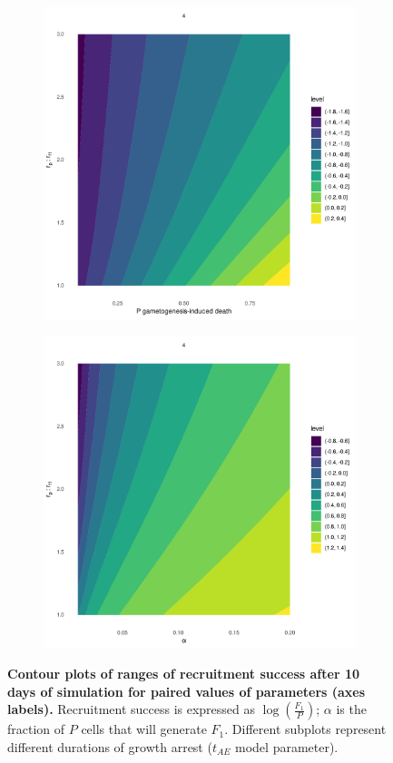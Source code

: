 \documentclass[a4paper,oneside]{article}
\begin{document}
    \begin{figure}[p]
      \centering
      \begin{subfigure}{\textwidth}
        \includegraphics[width=\linewidth]{imgs/a.pdf}
      \end{subfigure}

      \begin{subfigure}{\textwidth}
        \includegraphics[width=\linewidth]{imgs/b.pdf}
      \end{subfigure}
      \caption{\textbf{Contour plots of ranges of recruitment success after 10 days of simulation for paired values of parameters (axes labels).}
      Recruitment success is expressed as $\log(\frac{F_1}{P})$; $\alpha$ is the fraction of $P$ cells that will generate $F_{1}$.
      Different subplots represent different durations of growth arrest ($t_{AE}$ model parameter).
      }\label{swep}
    \end{figure}
\end{document}
